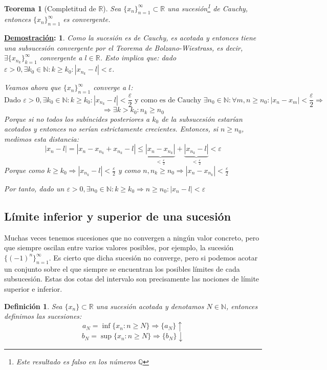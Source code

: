 \documentclass[10pt,a4paper,openright]{book}
\theoremstyle{break}
\newtheorem*{defi}{Definición}
\newtheorem*{theo}{Teorema}
\newtheorem*{demo}{\underline{Demostración}:}
\begin{document}
\begin{theo}[Completitud de $\mathbb R$]
Sea $\{x_n\}_{n=1}^\infty\subset \mathbb R$ una sucesión\footnote{Este resultado es falso en los números $\mathbb Q$} de Cauchy, entonces $\{x_n\}_{n=1}^\infty$ es convergente.
\end{theo}
\begin{demo}
Como la sucesión es de Cauchy, es acotada y entonces tiene una subsucesión convergente por el Teorema de Bolzano-Wiestrass, es decir, $\exists \{x_{n_k}\}_{k=1}^\infty$ convergente a $l\in \mathbb R$. Esto implica que: dado $\varepsilon>0, \exists k_0\in \mathbb N: k\geq k_0: |x_{n_k}-l|<\varepsilon$.\par

Veamos ahora que $\{x_n\}_{n=1}^\infty$ converge a $l$:
$$\mbox{Dado }\varepsilon>0, \exists k_0\in \mathbb N: k\geq k_0: |x_{n_k}-l|<\frac{\varepsilon}{2}\mbox{ y como es de Cauchy }\exists n_0\in\mathbb N: \forall m,n\geq n_0: |x_n-x_m|<\frac{\varepsilon}{2}\Rightarrow$$
$$\Rightarrow \exists k>k_0: n_k\geq n_0$$
Porque si no todos los subíncides posteriores a $k_0$ de la subsucesión estarían acotados y entonces no serían estrictamente crecientes.
Entonces, si $n\geq n_0$, medimos esta distancia:
$$|x_n-l|=|x_n-x_{n_k}+x_{n_k}-l|\leq \underbrace{|x_n-x_{n_k}|}_{< \frac{\varepsilon}{2}}+\underbrace{|x_{n_k}-l|}_{< \frac{\varepsilon}{2}}<\varepsilon$$
Porque como $k\geq k_0\Rightarrow |x_{n_k}-l|<\frac{\varepsilon}{2}$ y como $n,n_k\geq n_0\Rightarrow |x_n-x_{n_k}|<\frac{\varepsilon}{2}$

Por tanto, dado un $\varepsilon>0,\exists n_0\in \mathbb N: k\geq k_0\Rightarrow n\geq n_0: |x_n-l|<\varepsilon$
\end{demo}

\subsection{Límite inferior y superior de una sucesión}
Muchas veces tenemos sucesiones que no convergen a ningún valor concreto, pero que siempre oscilan entre varios valores posibles, por ejemplo, la sucesión $\{(-1)^n\}_{n=1}^\infty$. Es cierto que dicha sucesión no converge, pero si podemos acotar un conjunto sobre el que siempre se encuentran los posibles límites de cada subsucesión. Estas dos cotas del intervalo son precisamente las nociones de límite superior e inferior.

\begin{defi}
Sea $\{x_n\}\subset \mathbb R$ una sucesión acotada y denotamos $N\in \mathbb N$, entonces definimos las sucesiones:
$$a_N=\inf\{x_n: n\geq N\}\Rightarrow \{a_N\}\uparrow$$
$$b_N=\sup\{x_n: n\geq N\}\Rightarrow \{b_N\}\downarrow$$
\end{defi}
\end{document}
